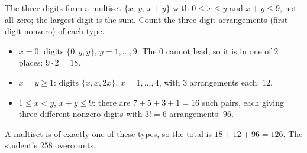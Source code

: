The three digits form a multiset $\{x,\,y,\,x+y\}$ with $0\le x\le y$ and $x+y\le9$, not all zero; the largest digit is the sum. Count the three-digit arrangements (first digit nonzero) of each type.
\begin{itemize}
\item $x=0$: digits $\{0,y,y\}$, $y=1,\dots,9$. The $0$ cannot lead, so it is in one of $2$ places: $9\cdot2=18$.
\item $x=y\ge1$: digits $\{x,x,2x\}$, $x=1,\dots,4$, with $3$ arrangements each: $12$.
\item $1\le x<y$, $x+y\le9$: there are $7+5+3+1=16$ such pairs, each giving three different nonzero digits with $3!=6$ arrangements: $96$.
\end{itemize}
A multiset is of exactly one of these types, so the total is $18+12+96=\boxed{126}$. The student's $258$ overcounts.
